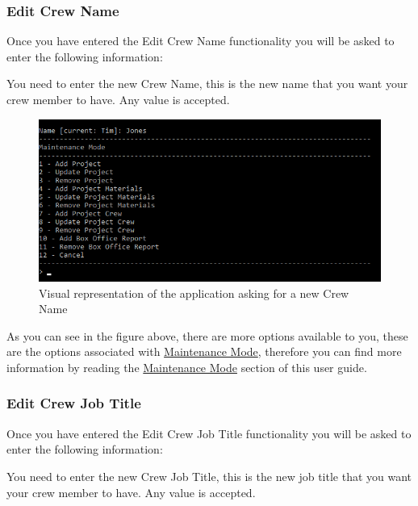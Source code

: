 \documentclass[
  english,
  a4paper,
,tablecaptionabove
]{scrartcl}
\begin{document}
\hypertarget{edit-crew-name-3}{%
\subsubsection{Edit Crew Name}\label{edit-crew-name-3}}

Once you have entered the Edit Crew Name functionality you will be asked
to enter the following information:

You need to enter the new Crew Name, this is the new name that you want
your crew member to have. Any value is accepted.

\begin{figure}
\centering
\includegraphics{images/user-guide/maintenance-mode/update-crew-name.png}
\caption{Visual representation of the application asking for a new Crew
Name}
\end{figure}

As you can see in the figure above, there are more options available to
you, these are the options associated with
\protect\hyperlink{using-maintenance-mode}{Maintenance Mode}, therefore
you can find more information by reading the
\protect\hyperlink{using-maintenance-mode}{Maintenance Mode} section of
this user guide.

\newpage

\hypertarget{edit-crew-job-title-3}{%
\subsubsection{Edit Crew Job Title}\label{edit-crew-job-title-3}}

Once you have entered the Edit Crew Job Title functionality you will be
asked to enter the following information:

You need to enter the new Crew Job Title, this is the new job title that
you want your crew member to have. Any value is accepted.
\end{document}
